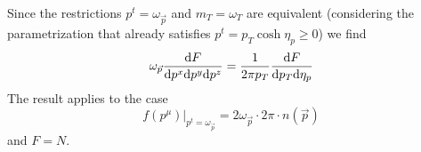 Since the restrictions $p^t=\omega_{\vec{p}}$ and $m_T=\omega_T$ are equivalent (considering the parametrization that already satisfies $p^t=p_T\cosh\eta_p\geq 0$) we find
\begin{equation}
    \omega_{\vec{p}}\frac{\text{d} F}{\text{d} p^x\text{d} p^y\text{d} p^z}=\frac{1}{2\pi p_T}\frac{\text{d} F}{\text{d} p_T\text{d}\eta_p}
\end{equation}
The result applies to the case
\begin{equation}
    f(p^\mu)\big\vert_{p^t=\omega_{\vec{p}}}=2\omega_{\vec{p}}\cdot 2\pi\cdot n(\vec{p})
\end{equation}
and $F=N$.